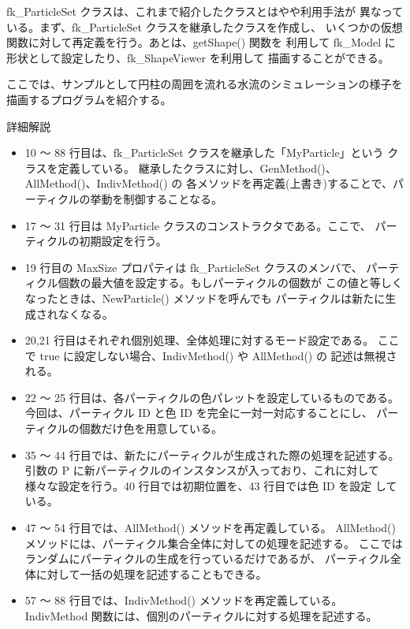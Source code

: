 fk\_ParticleSet クラスは、これまで紹介したクラスとはやや利用手法が
異なっている。まず、fk\_ParticleSet クラスを継承したクラスを作成し、
いくつかの仮想関数に対して再定義を行う。あとは、getShape() 関数を
利用して fk\_Model に形状として設定したり、fk\_ShapeViewer を利用して
描画することができる。

ここでは、サンプルとして円柱の周囲を流れる水流のシミュレーションの様子を
描画するプログラムを紹介する。
\begin{center}
詳細解説
\end{center}
\begin{itemize}
 \item 10 〜 88 行目は、fk\_ParticleSet クラスを継承した「MyParticle」という
	クラスを定義している。
	継承したクラスに対し、GenMethod()、AllMethod()、IndivMethod() の
	各メソッドを再定義(上書き)することで、パーティクルの挙動を制御することなる。

 \item 17 〜 31 行目は MyParticle クラスのコンストラクタである。ここで、
	パーティクルの初期設定を行う。

 \item 19 行目の MaxSize プロパティは fk\_ParticleSet クラスのメンバで、
	パーティクル個数の最大値を設定する。もしパーティクルの個数が
	この値と等しくなったときは、NewParticle() メソッドを呼んでも
	パーティクルは新たに生成されなくなる。

 \item 20,21 行目はそれぞれ個別処理、全体処理に対するモード設定である。
	ここで true に設定しない場合、IndivMethod() や AllMethod() の
	記述は無視される。

 \item 22 〜 25 行目は、各パーティクルの色パレットを設定しているものである。
	今回は、パーティクル ID と色 ID を完全に一対一対応することにし、
	パーティクルの個数だけ色を用意している。

 \item 35 〜 44 行目では、新たにパーティクルが生成された際の処理を記述する。
	引数の P に新パーティクルのインスタンスが入っており、これに対して
	様々な設定を行う。40 行目では初期位置を、43 行目では色 ID を設定
	している。

 \item 47 〜 54 行目では、AllMethod() メソッドを再定義している。
	AllMethod() メソッドには、パーティクル集合全体に対しての処理を記述する。
	ここではランダムにパーティクルの生成を行っているだけであるが、
	パーティクル全体に対して一括の処理を記述することもできる。

 \item 57 〜 88 行目では、IndivMethod() メソッドを再定義している。
	IndivMethod 関数には、個別のパーティクルに対する処理を記述する。


\end{itemize}
